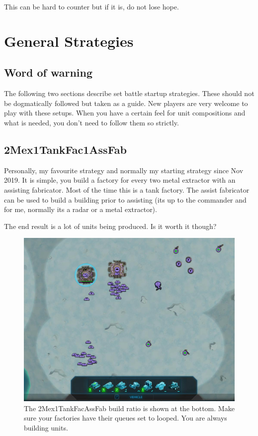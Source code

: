 \documentclass[]{article}
\begin{document}
This can be hard to counter but if it is, do not lose hope.  


\newpage
\section{General Strategies}


\subsection{Word of warning}
The following two sections describe set battle startup strategies.  These should not be dogmatically followed but taken as a guide.  New players are very welcome to play with these setups.  When you have a certain feel for unit compositions and what is needed, you don't need to follow them so strictly. 



\subsection{2Mex1TankFac1AssFab}


Personally, my favourite strategy and normally my starting strategy since Nov 2019.  It is simple, you build a factory for every two metal extractor with an assisting fabricator.  Most of the time this is a tank factory.  The assist fabricator can be used to build a building prior to assisting (its up to the commander and for me, normally its a radar or a metal extractor).

The end result is a lot of units being produced.  Is it worth it though?    
\begin{figure}[h]
	\centering
	\includegraphics[width=0.7\linewidth]{SBi860w}
	\caption{The 2Mex1TankFacAssFab build ratio is shown at the bottom. Make sure your factories have their queues set to looped. You are always building units.}
	\label{fig:SBi860w}
\end{figure}
\end{document}
